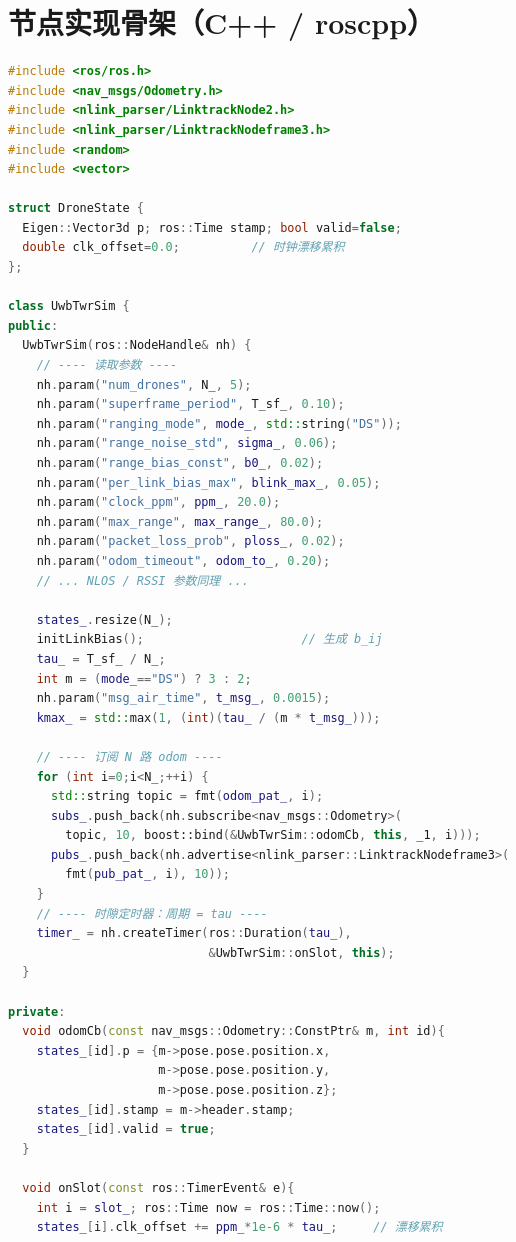 \documentclass[11pt,a4paper]{article}
\begin{document}
\section{节点实现骨架（C++ / roscpp）}
\begin{lstlisting}[language=C++,caption={uwb\_twr\_sim\_node.cpp 关键结构}]
#include <ros/ros.h>
#include <nav_msgs/Odometry.h>
#include <nlink_parser/LinktrackNode2.h>
#include <nlink_parser/LinktrackNodeframe3.h>
#include <random>
#include <vector>

struct DroneState {
  Eigen::Vector3d p; ros::Time stamp; bool valid=false;
  double clk_offset=0.0;          // 时钟漂移累积
};

class UwbTwrSim {
public:
  UwbTwrSim(ros::NodeHandle& nh) {
    // ---- 读取参数 ----
    nh.param("num_drones", N_, 5);
    nh.param("superframe_period", T_sf_, 0.10);
    nh.param("ranging_mode", mode_, std::string("DS"));
    nh.param("range_noise_std", sigma_, 0.06);
    nh.param("range_bias_const", b0_, 0.02);
    nh.param("per_link_bias_max", blink_max_, 0.05);
    nh.param("clock_ppm", ppm_, 20.0);
    nh.param("max_range", max_range_, 80.0);
    nh.param("packet_loss_prob", ploss_, 0.02);
    nh.param("odom_timeout", odom_to_, 0.20);
    // ... NLOS / RSSI 参数同理 ...

    states_.resize(N_);
    initLinkBias();                      // 生成 b_ij
    tau_ = T_sf_ / N_;
    int m = (mode_=="DS") ? 3 : 2;
    nh.param("msg_air_time", t_msg_, 0.0015);
    kmax_ = std::max(1, (int)(tau_ / (m * t_msg_)));

    // ---- 订阅 N 路 odom ----
    for (int i=0;i<N_;++i) {
      std::string topic = fmt(odom_pat_, i);
      subs_.push_back(nh.subscribe<nav_msgs::Odometry>(
        topic, 10, boost::bind(&UwbTwrSim::odomCb, this, _1, i)));
      pubs_.push_back(nh.advertise<nlink_parser::LinktrackNodeframe3>(
        fmt(pub_pat_, i), 10));
    }
    // ---- 时隙定时器：周期 = tau ----
    timer_ = nh.createTimer(ros::Duration(tau_),
                            &UwbTwrSim::onSlot, this);
  }

private:
  void odomCb(const nav_msgs::Odometry::ConstPtr& m, int id){
    states_[id].p = {m->pose.pose.position.x,
                     m->pose.pose.position.y,
                     m->pose.pose.position.z};
    states_[id].stamp = m->header.stamp;
    states_[id].valid = true;
  }

  void onSlot(const ros::TimerEvent& e){
    int i = slot_; ros::Time now = ros::Time::now();
    states_[i].clk_offset += ppm_*1e-6 * tau_;     // 漂移累积


\end{lstlisting}
\end{document}
